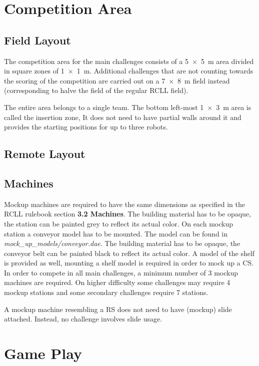 \documentclass[12pt,twoside]{article}
\begin{document}
\section{Competition Area}
\subsection{Field Layout}
The competition area for the main challenges consists of a \SI{5 x 5}{\metre}
area divided in square zones of \SI{1 x 1}{\metre}. Additional challenges that
are not counting towards the scoring of the competition are carried out on
a \SI{7 x 8}{\metre} field instead (corresponding to halve the field of the
regular \ac{RCLL} field).


The entire area belongs to a single team. The bottom left-most
\SI{1 x 3}{\metre} area is called the insertion zone, It does not need to have
partial walls around it and provides the starting positions for up to three
robots.
\subsection{Remote Layout}
\subsection{Machines}
Mockup machines are required to have the same dimensions as specified
 in the RCLL rulebook section \textbf{3.2 Machines}.
The building material has to be opaque, the station can be painted
 grey to reflect its actual color.\newline
On each mockup station a conveyor model has to be mounted.
The model can be found in \textit{mock\_up\_models/conveyor.dae}.
The building material has to be opaque, the conveyor belt can be
 painted black to reflect its actual color.\newline
A model of the shelf is provided as well, mounting a shelf model
 is required in order to mock up a \ac{CS}.
In order to compete in all main challenges, a minimum number of 3 mockup
machines are required. On higher difficulty some challenges may require
4 mockup stations and some secondary challenges require 7 stations.

A mockup machine resembling a \ac{RS} does not need to have (mockup) slide
attached. Instead, no challenge involves slide usage.
\section{Game Play}
\end{document}
